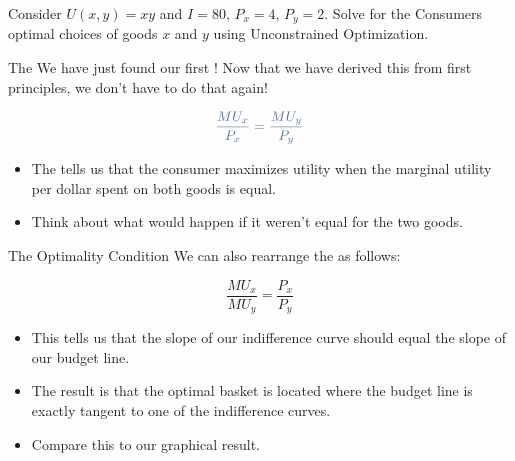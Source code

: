\documentclass[12pt,t]{beamer}
\begin{document}
\begin{frame}
  
  \bigskip
  Consider $U(x,y) = xy$ and $I=80$, $P_{x} = 4$, $P_{y}=2$. Solve for the Consumers optimal choices of goods $x$ and $y$ using Unconstrained Optimization.
\end{frame}

\begin{frame}{The }
  We have just found our first ! Now that we have derived this from first principles, we don't have to do that again!

  $$
    \navy{\frac{MU_x}{P_x} = \frac{MU_y}{P_y}}
  $$

  \pause\bigskip
  \begin{itemize}
    \item The  tells us that the consumer maximizes utility when the marginal utility per dollar spent on both goods is equal.
    \item Think about what would happen if it weren't equal for the two goods.
  \end{itemize}
\end{frame}

\begin{frame}{The Optimality Condition}
  We can also rearrange the  as follows:

  $$
    \frac{MU_x}{MU_y} = \frac{P_x}{P_y}
  $$

  \bigskip
  \begin{itemize}
    \item This tells us that the slope of our indifference curve should equal the slope of our budget line.
    \pause
    \item The result is that the optimal basket is located where the budget line is exactly tangent to one of the indifference curves.
    \item Compare this to our graphical result.
  \end{itemize}
\end{frame}
\end{document}
